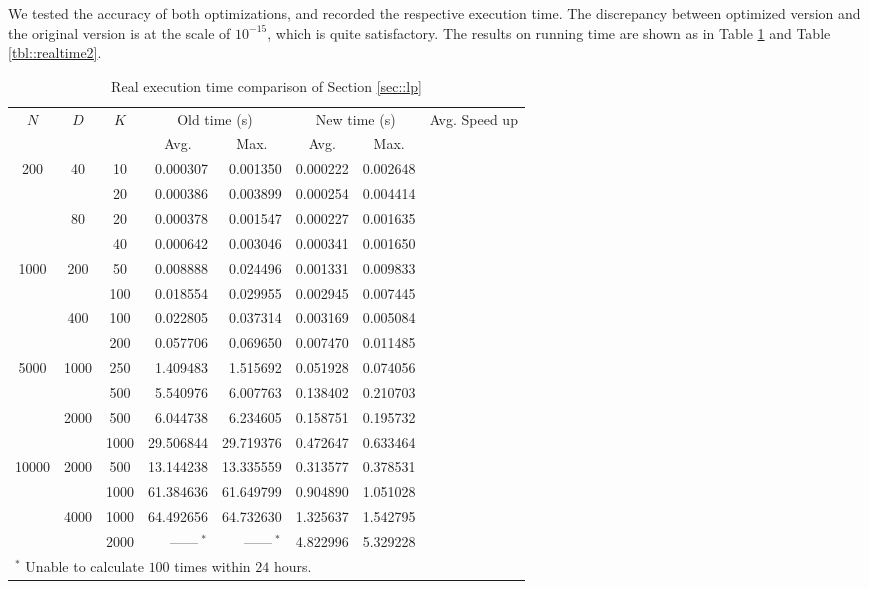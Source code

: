\documentclass{article}
\begin{document}
We tested the accuracy of both optimizations, and recorded the respective execution time. The discrepancy between optimized version and the original version is at the scale of $10^{-15}$, which is quite satisfactory. The results on running time are shown as in Table \ref{tbl::realtime1} and Table \ref{tbl::realtime2}.

\begin{table}[!h]
  \centering
  \small
  \caption{Real execution time comparison of Section \ref{sec::lp}}
  \label{tbl::realtime1}
  \begin{tabular}{cccrrrrr}
    \toprule
      \multirow{2}{*}{$N$} & \multirow{2}{*}{$D$} & \multirow{2}{*}{$K$} & \multicolumn{2}{c}{Old time (s)} & \multicolumn{2}{c}{New time (s)} & \multirow{2}{*}{Avg. Speed up} \\ \cmidrule(lr){4-5} \cmidrule(lr){6-7}
      & & & \multicolumn{1}{c}{Avg.} & \multicolumn{1}{c}{Max.} & \multicolumn{1}{c}{Avg.} & \multicolumn{1}{c}{Max.} \\
    \midrule
    \multirow{4}{*}{200} & \multirow{2}{*}{40} & 10 & 0.000307 & 0.001350 & 0.000222 & 0.002648 &
    \\
    & & 20 & 0.000386 & 0.003899 & 0.000254 & 0.004414 &
    \\
    & \multirow{2}{*}{80} & 20 & 0.000378 & 0.001547 & 0.000227 & 0.001635 & 
    \\
    & & 40 & 0.000642 & 0.003046 & 0.000341 & 0.001650 &
    \\
    \multirow{4}{*}{1000} & \multirow{2}{*}{200} & 50 & 0.008888 & 0.024496 & 0.001331 & 0.009833 &
    \\
    & & 100 & 0.018554 & 0.029955 & 0.002945 & 0.007445 &
    \\
    & \multirow{2}{*}{400} & 100 & 0.022805 & 0.037314 & 0.003169 & 0.005084 & 
    \\
    & & 200 & 0.057706 & 0.069650 & 0.007470 & 0.011485 &
    \\
    \multirow{4}{*}{5000} & \multirow{2}{*}{1000} & 250 & 1.409483 & 1.515692 & 0.051928 & 0.074056 &
    \\
    & & 500 & 5.540976 & 6.007763 & 0.138402 & 0.210703 &
    \\
    & \multirow{2}{*}{2000} & 500 & 6.044738 & 6.234605 & 0.158751 & 0.195732 & 
    \\
    & & 1000 & 29.506844 & 29.719376 & 0.472647 & 0.633464 &
    \\
    \multirow{4}{*}{10000} & \multirow{2}{*}{2000} & 500 & 13.144238 & 13.335559 & 0.313577 & 0.378531 &
    \\
    & & 1000 & 61.384636 & 61.649799 & 0.904890 & 1.051028 &
    \\
    & \multirow{2}{*}{4000} & 1000 & 64.492656 & 64.732630 & 1.325637 & 1.542795 & 
    \\
    & & 2000 & \multicolumn{1}{c}{~~~------$~^*$} & \multicolumn{1}{c}{~~~------$~^*$} & 4.822996 & 5.329228 &
    \\
    \bottomrule
    \multicolumn{7}{l}{$^*$ Unable to calculate $100$ times within $24$ hours.}
  \end{tabular}
\end{table}
\end{document}
